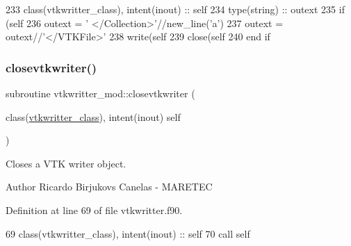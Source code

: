 \begin{DoxyCode}
233     \textcolor{keywordtype}{class}(vtkwritter\_class), \textcolor{keywordtype}{intent(inout)} :: self
234     \textcolor{keywordtype}{type}(string) :: outext
235     \textcolor{keywordflow}{if} (self%
236         outext = \textcolor{stringliteral}{'  </Collection>'}//new\_line(\textcolor{stringliteral}{'a'})
237         outext = outext//\textcolor{stringliteral}{'</VTKFile>'}
238         \textcolor{keyword}{write}(self%
239         \textcolor{keyword}{close}(self%
240 \textcolor{keywordflow}{    end if}
\end{DoxyCode}
\mbox{\label{namespacevtkwritter__mod_a13f1b870d2367704bcd4143a80b552f9}} 
\subsubsection{\texorpdfstring{closevtkwriter()}{closevtkwriter()}}
{\footnotesize\ttfamily subroutine vtkwritter\+\_\+mod\+::closevtkwriter (\begin{DoxyParamCaption}\item[{class(\mbox{\hyperlink{structvtkwritter__mod_1_1vtkwritter__class}{vtkwritter\+\_\+class}}), intent(inout)}]{self }\end{DoxyParamCaption})\hspace{0.3cm}{\ttfamily [private]}}



Closes a V\+TK writer object. 

\begin{DoxyAuthor}{Author}
Ricardo Birjukovs Canelas -\/ M\+A\+R\+E\+T\+EC 
\end{DoxyAuthor}


Definition at line 69 of file vtkwritter.\+f90.


\begin{DoxyCode}
69     \textcolor{keywordtype}{class}(vtkwritter\_class), \textcolor{keywordtype}{intent(inout)} :: self
70     \textcolor{keyword}{call }self%
\end{DoxyCode}
\mbox{\label{namespacevtkwritter__mod_a9f44d9fd1c5da759c4f2d721d12a8181}} 

